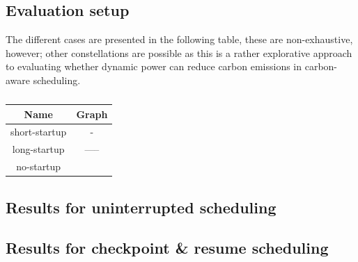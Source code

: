 \subsection{Evaluation setup}

The different cases are presented in the following table, these are non-exhaustive, however; other constellations are possible as this is a rather explorative approach to evaluating whether dynamic power can reduce carbon emissions in carbon-aware scheduling.



\begin{table}[h!]
\centering
\begin{tabular}{c|c}
    Name & Graph \\ \hline
    short-startup & - \\
    long-startup & ----- \\
    no-startup &  \\
\end{tabular}
\caption{}
\label{tab:eval_test_cases}
\end{table}







\subsection{Results for uninterrupted scheduling}

\subsection{Results for checkpoint \& resume scheduling}
